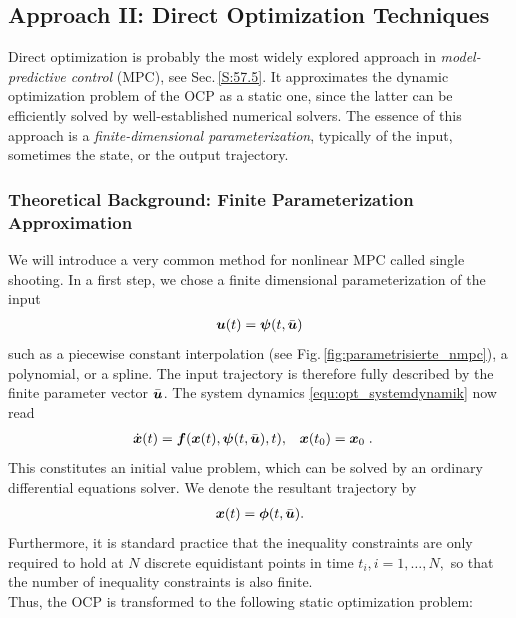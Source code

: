 \subsection{Approach II: Direct Optimization Techniques}\label{S:57.3.2}


Direct optimization is probably the most widely explored approach in \textit{model-predictive control} (MPC), see Sec.\,\ref{S:57.5}. It approximates the dynamic optimization problem of the OCP as a static one, since the latter can be efficiently solved by well-established numerical solvers. The essence of this approach is a \textit{finite-dimensional parameterization}, typically of the input, sometimes the state, or the output trajectory.

\subsubsection{Theoretical Background: Finite Parameterization Approximation}\label{S:57.3.2.1}
We will introduce a very common method for nonlinear MPC called single shooting. In a first step, we chose a finite dimensional parameterization of the input
\begin{align*}
	\boldsymbol{u}(t) = \boldsymbol{\psi}(t,\bar{\boldsymbol{u}})
\end{align*}
such as a piecewise constant interpolation (see  Fig.\,\ref{fig:parametrisierte_nmpc}), a polynomial, or a spline. The input trajectory is therefore fully described by the finite parameter vector $\bar{\boldsymbol{u}}$. The system dynamics \eqref{equ:opt_systemdynamik} now read
\begin{align*}
	\dot{\boldsymbol{x}}(t) = \boldsymbol{f}(\boldsymbol{x}(t),\boldsymbol{\psi}(t,\bar{\boldsymbol{u}}),t), \quad &\boldsymbol{x}(t_0) = \boldsymbol{x}_0\; .
\end{align*}
This constitutes an initial value problem, which can be solved by an ordinary differential equations solver. We denote the resultant trajectory by 
\begin{align*}
\boldsymbol{x}(t) = \boldsymbol{\phi}(t,\bar{\boldsymbol{u}}).
\end{align*}
Furthermore, it is standard practice that the inequality constraints are only required to hold at $N$ discrete equidistant points in time $t_i,i=1,\dots,N,$ so that the number of inequality constraints is also finite. \\
Thus, the OCP is transformed to the following static optimization problem: \\

